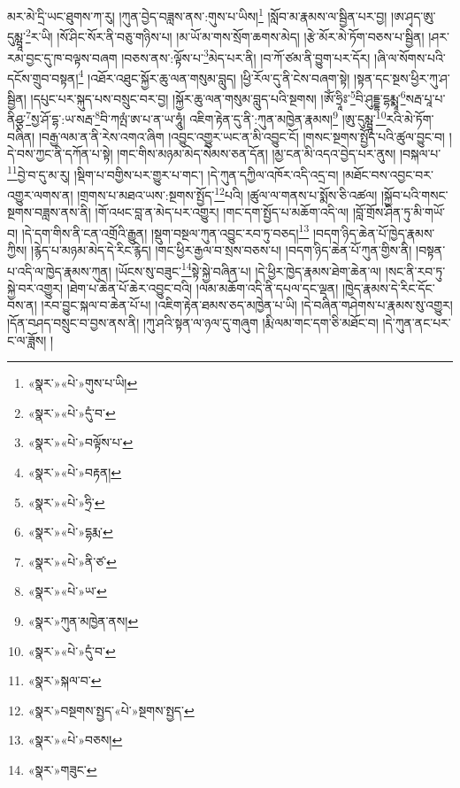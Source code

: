 མར་མེ་དྲི་ཡང་ཐུགས་ཀ་རུ། །ཀུན་བྱེད་བཟླས་ནས་:གུས་པ་ཡིས།\footnote{«སྣར་»«པེ་»གུས་པ་ཡི།} །སློབ་མ་རྣམས་ལ་སྦྱིན་པར་བྱ། །ཨ་ཤྭད་ཨུ་དུམྺཱ་\footnote{«སྣར་»«པེ་»དུཾ་བ་}ར་ཡི། །སོ་ཤིང་སོར་ནི་བཅུ་གཉིས་པ། །མ་ཡོ་མ་གས་སྲོག་ཆགས་མེད། །རྩེ་མོར་མེ་ཏོག་བཅས་པ་སྦྱིན། །ཤར་རམ་བྱང་དུ་ཁ་བལྟས་བཞག །བཅས་ནས་:ལྟོས་པ་\footnote{«སྣར་»«པེ་»བལྟོས་པ་}མེད་པར་ནི། །བ་ཀོ་ཙམ་ནི་བྱུག་པར་དོར། །ཞི་ལ་སོགས་པའི་དངོས་གྲུབ་བསྟན།\footnote{«སྣར་»«པེ་»བརྟན།} །འཐོར་འཐུང་སྐྱོར་ཆུ་ལན་གསུམ་བླུད། །ཕྱི་རོལ་དུ་ནི་ངེས་བཞག་སྟེ། །སྟན་དང་སྔས་ཕྱིར་ཀུ་ཤ་སྦྱིན། །དཔུང་པར་སྐུད་པས་བསྲུང་བར་བྱ། །སྐྱོར་ཆུ་ལན་གསུམ་བླུད་པའི་སྔགས། །ཨོཾ་ཧྲཱིཿ་\footnote{«སྣར་»«པེ་»ཧྲི་}བི་ཤུདྡྷ་དྷརྨྨཱ་\footnote{«སྣར་»«པེ་»དྷརྨ་}སརྦ་པཱ་པ་ནིཤྩ་\footnote{«སྣར་»«པེ་»ནི་ཙ་}སྱ་ཤོ་དྷ་:ཡ་སརྦ་\footnote{«སྣར་»«པེ་»ཡ་}བི་ཀལྤཾ་ཨ་པ་ན་ཡ་ཧཱུཾ། འཇིག་རྟེན་དུ་ནི་:ཀུན་མཁྱེན་རྣམས།\footnote{«སྣར་»ཀུན་མཁྱེན་ནས།} །ཨུ་དུམྺཱ་\footnote{«སྣར་»«པེ་»དུཾ་བ་}རའི་མེ་ཏོག་བཞིན། །བརྒྱ་ལམ་ན་ནི་རེས་འགའ་ཞིག །འབྱུང་འགྱུར་ཡང་ན་མི་འབྱུང་ངོ། །གསང་སྔགས་སྤྱོད་པའི་ཚུལ་བྱུང་བ། །དེ་བས་ཀྱང་ནི་དཀོན་པ་སྟེ། །གང་གིས་མཉམ་མེད་སེམས་ཅན་དོན། །མྱ་ངན་མི་འདའ་བྱེད་པར་ནུས། །བསྐལ་པ་\footnote{«སྣར་»སྐལ་བ་}བྱེ་བ་དུ་མ་རུ། །སྡིག་པ་བགྱིས་པར་གྱུར་པ་གང་། །དེ་ཀུན་དཀྱིལ་འཁོར་འདི་འདྲ་བ། །མཐོང་བས་འབྱང་བར་འགྱུར་ལགས་ན། །གྲགས་པ་མཐའ་ཡས་:སྔགས་སྤྱོད་\footnote{«སྣར་»བསྔགས་སྤྱད་«པེ་»སྔགས་སྤྱད་}པའི། །ཚུལ་ལ་གནས་པ་སྨོས་ཅི་འཚལ། །སྐྱོབ་པའི་གསང་སྔགས་བཟླས་ནས་ནི། །གོ་འཕང་བླ་ན་མེད་པར་འགྱུར། །གང་དག་སྤྱོད་པ་མཆོག་འདི་ལ། །བློ་གྲོས་ཤིན་ཏུ་མི་གཡོ་བ། །དེ་དག་གིས་ནི་ངན་འགྲོའི་རྒྱུན། །སྡུག་བསྔལ་ཀུན་འབྱུང་རབ་ཏུ་བཅད།\footnote{«སྣར་»«པེ་»བཅས།} །བདག་ཉིད་ཆེན་པོ་ཁྱེད་རྣམས་ཀྱིས། །རྙེད་པ་མཉམ་མེད་དེ་རིང་རྙེད། །གང་ཕྱིར་རྒྱལ་བ་སྲས་བཅས་པ། །བདག་ཉིད་ཆེན་པོ་ཀུན་གྱིས་ནི། །བསྟན་པ་འདི་ལ་ཁྱེད་རྣམས་ཀུན། །ཡོངས་སུ་བཟུང་\footnote{«སྣར་»གཟུང་}སྟེ་སྐྱེ་བཞིན་པ། །དེ་ཕྱིར་ཁྱེད་རྣམས་ཐེག་ཆེན་ལ། །སང་ནི་རབ་ཏུ་སྐྱེ་བར་འགྱུར། །ཐེག་པ་ཆེན་པོ་ཆེར་འབྱུང་བའི། །ལམ་མཆོག་འདི་ནི་དཔལ་དང་ལྡན། །ཁྱེད་རྣམས་དེ་རིང་དོང་བས་ན། །རབ་བྱུང་སྐལ་བ་ཆེན་པོ་པ། །འཇིག་རྟེན་ཐམས་ཅད་མཁྱེན་པ་ཡི། །དེ་བཞིན་གཤེགས་པ་རྣམས་སུ་འགྱུར། །དོན་བཤད་བསྲུང་བ་བྱས་ནས་ནི། །ཀུ་ཤའི་སྟན་ལ་ཉལ་དུ་གཞུག །རྨི་ལམ་གང་དག་ཅི་མཐོང་བ། །དེ་ཀུན་ནང་པར་ང་ལ་ཟློས། །
